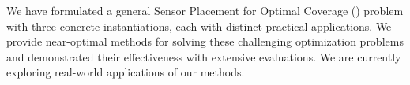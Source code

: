 \vspace{-1mm}
We have formulated a general Sensor Placement for Optimal Coverage (\spoc) problem with three concrete instantiations, each with distinct practical applications. We provide near-optimal methods for solving these challenging optimization problems and demonstrated their effectiveness with extensive evaluations. We are currently exploring real-world applications of our methods.  